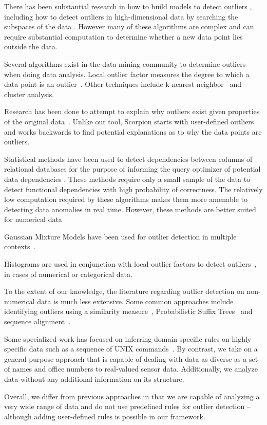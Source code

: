 
There has been substantial research in how to build models to detect outliers \cite{Aggarwal2013}, including how to detect outliers in high-dimensional data by searching the subspaces of the data \cite{Zhang2004}\cite{Kriegel2009}.
However many of these algorithms are complex and can require substantial computation to determine whether a new data point lies outside the data.

Several algorithms exist in the data mining community to determine outliers when doing data analysis.
Local outlier factor measures the degree to which a data point is an outlier~\cite{Breunig2000}.
Other techniques include k-nearest neighbor~\cite{Ramaswamy2000} and cluster analysis.

Research has been done to attempt to explain why outliers exist given properties of the original data~\cite{Wu}. Unlike our tool, Scorpion starts with user-defined outliers and works backwards to find potential explanations as to why the data points are outliers.

Statistical methods have been used to detect dependencies between columns of relational databases for the purpose of informing the query optimizer of potential data dependencies \cite{Ilyas2004}. These methods require only a small sample of the data to detect functional dependencies with high probability of correctness. The relatively low computation required by these algorithms makes them more amenable to detecting data anomalies in real time. However, these methods are better suited for numerical data~\cite{Hodge2004}

Gaussian Mixture Models have been used for outlier detection in multiple contexts~\cite{Lu2005,Roberts1994,Roberts1999}.

Histograms are used in conjunction with local outlier factors to detect outliers~\cite{Gebski2007,Sheng2007}, in cases of numerical or categorical data.

To the extent of our knowledge, the literature regarding outlier detection on non-numerical data is much less extensive. Some common approaches include identifying outliers using a similarity measure~\cite{Budalakoti2006}, Probabilistic Suffix Trees~\cite{Sun2006} and sequence alignment~\cite{Bouarfa2012}.

Some specialized work has focused on inferring domain-specific rules on highly specific data such as a sequence of UNIX commands~\cite{Lane1997a,Lane1997b}. By contrast, we take on a general-purpose approach that is capable of dealing with data as diverse as a set of names and office numbers to real-valued sensor data. Additionally, we analyze data without any additional information on its structure.

Overall, we differ from previous approaches in that we are capable of analyzing a very wide range of data and do not use predefined rules for outlier detection -- although adding user-defined rules is possible in our framework.
